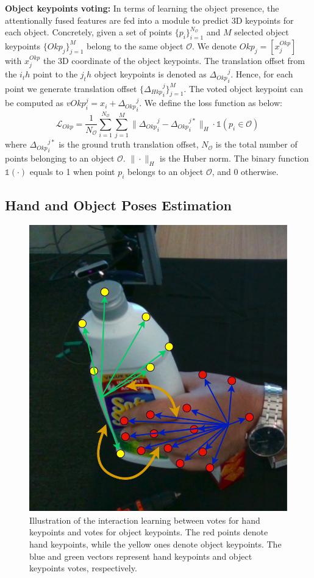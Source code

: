 \textbf{Object keypoints voting:} In terms of learning the object presence, the attentionally fused features are fed into a module to predict 3D keypoints for each object. Concretely, given a set of points $\{ p_i \}^{N_{\mathcal{O}}}_{i=1}$ and $M$ selected object keypoints $\{ Okp_j \}^{M}_{j=1}$ belong to the same object $\mathcal{O}$. We denote $Okp_j = [x^{Okp}_j]$ with $x^{Okp}_j$ the 3D coordinate of the object keypoints. The translation offset from the $i_th$ point to the $j_th$ object keypoints is denoted as ${\Delta_{Okp}}^j_i$. Hence, for each point we generate translation offset $\{ {\Delta_{Hkp}}^j_i \}^{M}_{j=1}$. The voted object keypoint can be computed as $vOkp^j_i = x_i + {\Delta_{Okp}}^j_i$. We define the loss function as below:
\begin{equation}
	\mathcal{L}_{Okp} = \frac{1}{N_{\mathcal{O}}} \sum_{i=1}^{N_{\mathcal{O}}} \sum_{j=1}^{M} \|{\Delta_{Okp}}^j_i - {\Delta_{Okp}}^{j*}_i \|_H \cdot \mathds{1}(p_i \in \mathcal{O}) \
	\label{eq:loss_objectpoints}
\end{equation}
where ${\Delta_{Okp}}^{j*}_i$ is the ground truth translation offset, $N_{\mathcal{O}}$ is the total number of points belonging to an object $\mathcal{O}$. $\| \cdot \|_H$ is the Huber norm. The binary function $\mathds{1}(\cdot)$ equals to 1 when point $p_i$ belongs to an object $\mathcal{O}$, and 0 otherwise.

\subsection{Hand and Object Poses Estimation}
\label{sec:interaction}
\begin{figure}[h!]
	\centering
	\includegraphics[width=0.6\linewidth]{Figs/Hand-object.png}
	\caption{Illustration of the interaction learning between votes for hand keypoints and votes for object keypoints. The red points denote hand keypoints, while the yellow ones denote object keypoints. The blue and green vectors represent hand keypoints and object keypoints votes, respectively.}
\end{figure}

